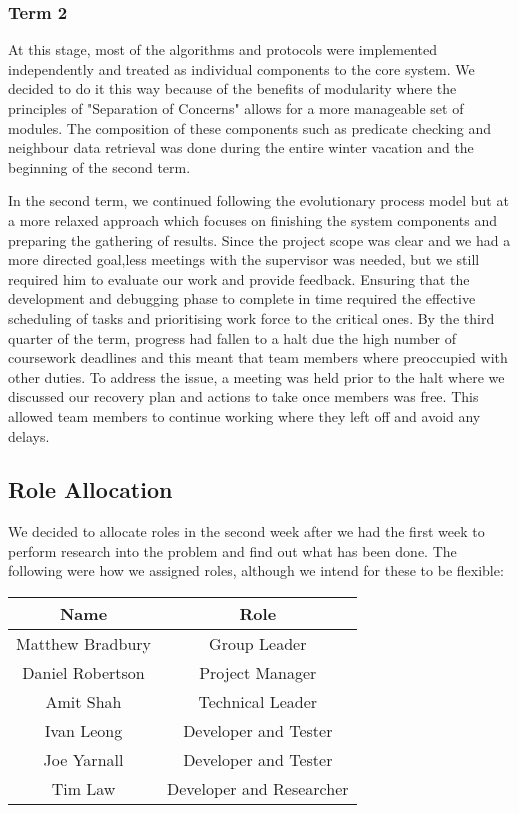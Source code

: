 
\subsubsection*{Term 2}

At this stage, most of the algorithms and protocols were implemented independently and treated as individual components to the core system. We decided to do it this way because of the benefits of modularity where the principles of "Separation of Concerns" allows for a more manageable set of modules. The composition of these components such as predicate checking and neighbour data retrieval was done during the entire winter vacation and the beginning of the second term.

In the second term, we continued following the evolutionary process model but at a more relaxed approach which focuses on finishing the system components and preparing the gathering of results. Since the project scope was clear and we had a more directed goal,less meetings with the supervisor was needed, but we still required him to evaluate our work and provide feedback. Ensuring that the development and debugging phase to complete in time required the effective scheduling of tasks and prioritising work force to the critical ones. By the third quarter of the term, progress had fallen to a halt due the high number of coursework deadlines and this meant that team members where preoccupied with other duties. To address the issue, a meeting was held prior to the halt where we discussed our recovery plan and actions to take once members was free. This allowed team members to continue working where they left off and avoid any delays.

\subsection{Role Allocation}

We decided to allocate roles in the second week after we had the first week to perform research into the problem and find out what has been done. The following were how we assigned roles, although we intend for these to be flexible:

\begin{table}[H]
\centering
	\begin{tabular}{| c | c |}
		\hline
		Name & Role\\
		\hline
		Matthew Bradbury & Group Leader\\
		Daniel Robertson & Project Manager\\
		Amit Shah & Technical Leader\\
		Ivan Leong & Developer and Tester\\
		Joe Yarnall & Developer and Tester\\
		Tim Law & Developer and Researcher\\
		\hline
	\end{tabular}
\end{table}

